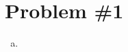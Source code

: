 \documentclass[11pt]{article}
\numberwithin{equation}{section}
\begin{document}


\section{Problem \#1}
\begin{enumerate}[(a)]
\item
\end{enumerate}
\end{document}
